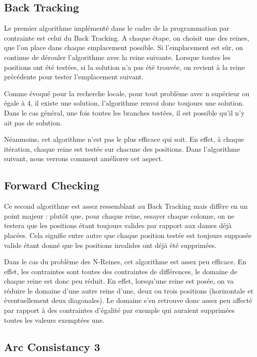\documentclass[a4paper,10pt]{article}
\begin{document}
\subsection{Back Tracking}

Le premier algorithme implémenté dans le cadre de la programmation par contrainte est celui du Back Tracking. A chaque étape, on choisit une des reines, que l'on place dans chaque emplacement possible. Si l'emplacement est sûr, on continue de dérouler l'algorithme avec la reine suivante. Lorsque toutes les positions ont été testées, si la solution n'a pas été trouvée, on revient à la reine précédente pour tester l'emplacement suivant.

Comme évoqué pour la recherche locale, pour tout problème avec n supérieur ou égale à 4, il existe une solution, l'algorithme renvoi donc toujours une solution. Dans le cas général, une fois toutes les branches testées, il est possible qu'il n'y ait pas de solution.

Néanmoins, cet algorithme n'est pas le plus efficace qui soit. En effet, à chaque itération, chaque reine est testée sur chacune des positions. Dans l'algorithme suivant, nous verrons comment améliorer cet aspect.

\subsection{Forward Checking}

Ce second algorithme est assez ressemblant au Back Tracking mais diffère en un point majeur : plutôt que, pour chaque reine, essayer chaque colonne, on ne testera que les positions étant toujours valides par rapport aux dames déjà placées. Cela signifie entre autre que chaque position testée est toujours supposée valide étant donné que les positions invalides ont déjà été supprimées.

Dans le cas du problème des N-Reines, cet algorithme est assez peu efficace. En effet, les contraintes sont toutes des contraintes de différences, le domaine de chaque reine est donc peu réduit. En effet, lorsqu'une reine est posée, on va réduire le domaine d'une autre reine d'une, deux ou trois positions (horizontale et éventuellement deux diagonales). Le domaine s'en retrouve donc assez peu affecté par rapport à des contraintes d'égalité par exemple qui auraient supprimées toutes les valeurs exemptées une.

\subsection{Arc Consistancy 3}
\end{document}
